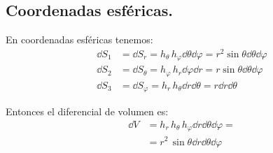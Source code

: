 \subsection{Coordenadas esféricas.}

En coordenadas esféricas tenemos:
\begin{align*}
\dd{S_{1}} &= \dd{S_{r}} = h_{\theta} \, h_{\varphi} \dd{\theta} \dd{\varphi} = r^{2} \sin \theta \dd{\theta} \dd{\varphi} \\[0.5em]
\dd{S_{2}} &= \dd{S_{\theta}} = h_{\varphi} \, h_{r} \dd{\varphi} \dd{r} = r \sin \theta \dd{\theta} \dd{\varphi} \\[0.5em]
\dd{S_{3}} &= \dd{S_{\varphi}} = h_{r} \, h_{\theta} \dd{r} \dd{\theta} = r \dd{r} \dd{\theta}
\end{align*}

Entonces el diferencial de volumen es:
\begin{align*}
\dd{V} &= h_{r} \, h_{\theta} \, h_{\varphi} \dd{r} \dd{\theta} \dd{\varphi} = \\[0.5em]
&= r^{2} \, \sin \theta \dd{r} \dd{\theta} \dd{\varphi}
\end{align*}



